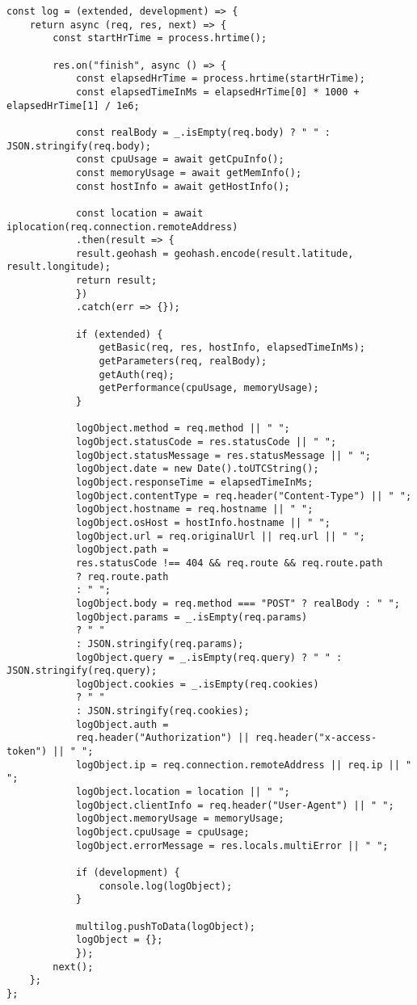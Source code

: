 \begin{lstlisting}[style=ES6, caption=Log object, label=code:logObject]
const log = (extended, development) => {
	return async (req, res, next) => {
		const startHrTime = process.hrtime();
		
		res.on("finish", async () => {
			const elapsedHrTime = process.hrtime(startHrTime);
			const elapsedTimeInMs = elapsedHrTime[0] * 1000 + elapsedHrTime[1] / 1e6;
			
			const realBody = _.isEmpty(req.body) ? " " : JSON.stringify(req.body);
			const cpuUsage = await getCpuInfo();
			const memoryUsage = await getMemInfo();
			const hostInfo = await getHostInfo();
			
			const location = await iplocation(req.connection.remoteAddress)
			.then(result => {
			result.geohash = geohash.encode(result.latitude, result.longitude);
			return result;
			})
			.catch(err => {});
			
			if (extended) {
				getBasic(req, res, hostInfo, elapsedTimeInMs);
				getParameters(req, realBody);
				getAuth(req);
				getPerformance(cpuUsage, memoryUsage);
			}
			
			logObject.method = req.method || " ";
			logObject.statusCode = res.statusCode || " ";
			logObject.statusMessage = res.statusMessage || " ";
			logObject.date = new Date().toUTCString();
			logObject.responseTime = elapsedTimeInMs;
			logObject.contentType = req.header("Content-Type") || " ";
			logObject.hostname = req.hostname || " ";
			logObject.osHost = hostInfo.hostname || " ";
			logObject.url = req.originalUrl || req.url || " ";
			logObject.path =
			res.statusCode !== 404 && req.route && req.route.path
			? req.route.path
			: " ";
			logObject.body = req.method === "POST" ? realBody : " ";
			logObject.params = _.isEmpty(req.params)
			? " "
			: JSON.stringify(req.params);
			logObject.query = _.isEmpty(req.query) ? " " : JSON.stringify(req.query);
			logObject.cookies = _.isEmpty(req.cookies)
			? " "
			: JSON.stringify(req.cookies);
			logObject.auth =
			req.header("Authorization") || req.header("x-access-token") || " ";
			logObject.ip = req.connection.remoteAddress || req.ip || " ";
			logObject.location = location || " ";
			logObject.clientInfo = req.header("User-Agent") || " ";
			logObject.memoryUsage = memoryUsage;
			logObject.cpuUsage = cpuUsage;
			logObject.errorMessage = res.locals.multiError || " ";
			
			if (development) {
				console.log(logObject);
			}
			
			multilog.pushToData(logObject);
			logObject = {};
			});
		next();
	};
};

\end{lstlisting}

